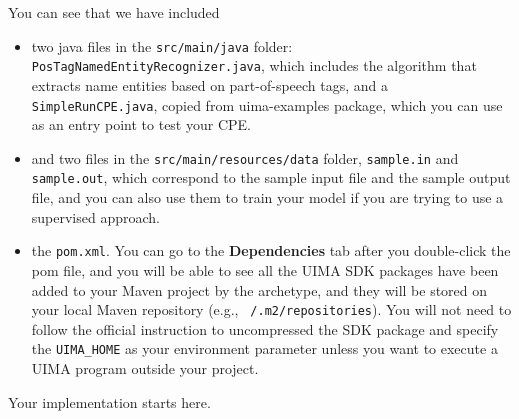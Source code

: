 You can see that we have included

\begin{itemize}

\item two java files in the \texttt{src/main/java} folder:
\texttt{PosTagNamedEntityRecognizer.java}, which includes the algorithm that
extracts name entities based on part-of-speech tags, and a
\texttt{SimpleRunCPE.java}, copied from uima-examples package, which you can use
as an entry point to test your CPE.

\item and two files in the \texttt{src/main/resources/data} folder,
\texttt{sample.in} and \texttt{sample.out}, which correspond to the sample input
file and the sample output file, and you can also use them to train your model
if you are trying to use a supervised approach.

\item the \texttt{pom.xml}. You can go to the \textbf{Dependencies} tab after
you double-click the pom file, and you will be able to see all the UIMA SDK
packages have been added to your Maven project by the archetype, and they will
be stored on your local Maven repository (e.g., \texttt{~/.m2/repositories}).
You will not need to follow the official instruction to uncompressed the SDK
package and specify the \verb|UIMA_HOME| as your environment parameter unless
you want to execute a UIMA program outside your project.

\end{itemize}

Your implementation starts here.

